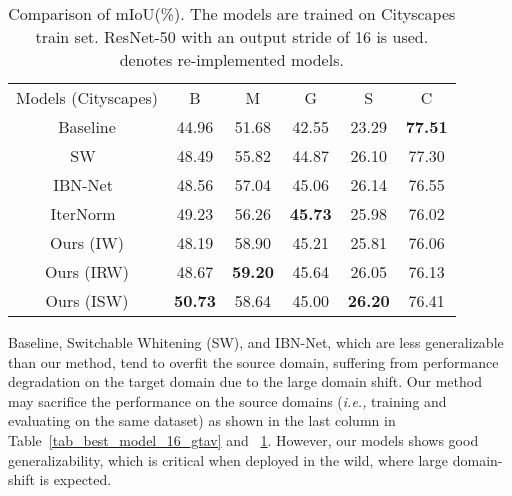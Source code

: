 \documentclass[final]{latex/cvpr}
\newcommand{\drule}{\specialrule{0.2pt}{1pt}{1pt}\specialrule{0.2pt}{0pt}{\belowrulesep}}
\begin{document}
\begin{table}[b!]
\vspace{-0.4cm}
\begin{center}
\footnotesize
\begin{tabular}{c|c|c|c|c||c}
\toprule
Models (Cityscapes) & B & M & G & S & C \\
\drule
Baseline  & 44.96      & 51.68      & 42.55      & 23.29      & \textbf{77.51}  \\ 
\midrule
SW~\cite{pan2019switchable} & 48.49      & 55.82 & 44.87      & 26.10      & 77.30       \\ 
\midrule
IBN-Net~\cite{pan2018two}      & 48.56      & 57.04      & 45.06      & 26.14      & 76.55      \\ 
\midrule
IterNorm~\cite{huang2019iterative} & 49.23      & 56.26 & \textbf{45.73}      & 25.98      & 76.02       \\ 
\midrule
Ours (IW) & 48.19      & 58.90      & 45.21      & 25.81      & 76.06      \\ 
\midrule
Ours (IRW)                   & 48.67 & \textbf{59.20} & 45.64
& 26.05      & 76.13      \\ 
\midrule
Ours (ISW)                   & \textbf{50.73} & 58.64 & 45.00 & \textbf{26.20} & 76.41      \\ 
\bottomrule
\end{tabular}
\end{center}
\vspace*{-0.17cm}
\caption{Comparison of mIoU(\%). The models are trained on Cityscapes train set. ResNet-50 with an output stride of 16 is used.
 denotes re-implemented models.}
\label{tab_best_model_16_city}
\vspace{-0.2cm}
\end{table}

Baseline, Switchable Whitening (SW), and IBN-Net, which are less generalizable than our method, tend to overfit the source domain, suffering from performance degradation on the target domain due to the large domain shift. 
Our method may sacrifice the performance on the source domains (\textit{i.e.,} training and evaluating on the same dataset) as shown in the last column in Table~\ref{tab_best_model_16_gtav} and ~\ref{tab_best_model_16_city}. 
However, our models shows good generalizability, which is critical when deployed in the wild, where large domain-shift is expected.
\end{document}

